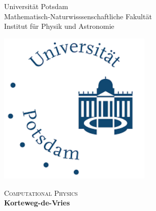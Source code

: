 \begin{titlepage}

\begin{center}



\begin{minipage}{0.57\textwidth}
\begin{flushleft}\large
\begin{center}
Universität Potsdam\\
Mathematisch-Naturwisssenschaftliche Fakultät\\
Institut für Physik und Astronomie\\
\end{center}
\end{flushleft}
\end{minipage}
\hfill
\begin{minipage}{0.42\textwidth}
\begin{flushright}
\begin{center}
\includegraphics[width=0.55\textwidth]{logo.png}\\ 
\end{center}
\end{flushright}
\end{minipage}
\vfill
\vspace*{0.5cm}
\textsc{\large Computational Physics}\\[0.5cm]


{ \Huge \bfseries Korteweg-de-Vries}\\[0.4cm]

\vspace*{2.5cm}


\end{center}
\end{titlepage}
